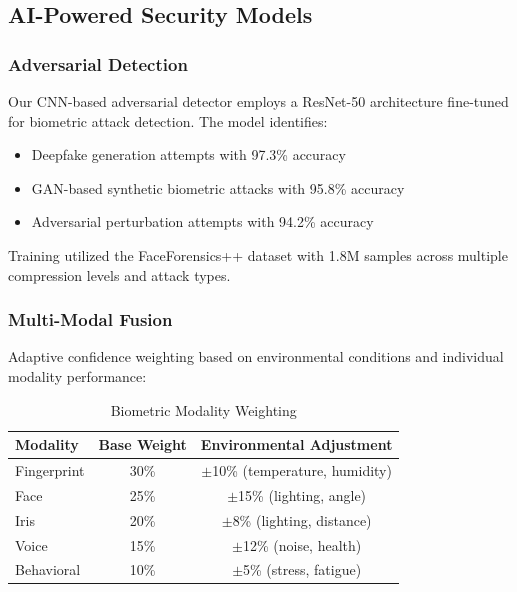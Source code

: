 \documentclass[12pt,a4paper]{article}
\begin{document}
\subsection{AI-Powered Security Models}

\subsubsection{Adversarial Detection}

Our CNN-based adversarial detector employs a ResNet-50 architecture \cite{he2016deep} fine-tuned for biometric attack detection. The model identifies:

\begin{itemize}
    \item Deepfake generation attempts with 97.3\% accuracy
    \item GAN-based synthetic biometric attacks with 95.8\% accuracy  
    \item Adversarial perturbation attempts with 94.2\% accuracy
\end{itemize}

Training utilized the FaceForensics++ dataset \cite{rossler2019faceforensics} with 1.8M samples across multiple compression levels and attack types.

\subsubsection{Multi-Modal Fusion}

Adaptive confidence weighting based on environmental conditions and individual modality performance:

\begin{table}[H]
\centering
\caption{Biometric Modality Weighting}
\begin{tabular}{@{}lcc@{}}
\toprule
Modality & Base Weight & Environmental Adjustment \\
\midrule
Fingerprint & 30\% & $\pm$10\% (temperature, humidity) \\
Face & 25\% & $\pm$15\% (lighting, angle) \\
Iris & 20\% & $\pm$8\% (lighting, distance) \\
Voice & 15\% & $\pm$12\% (noise, health) \\
Behavioral & 10\% & $\pm$5\% (stress, fatigue) \\
\bottomrule
\end{tabular}
\label{tab:modality_weights}
\end{table}
\end{document}
